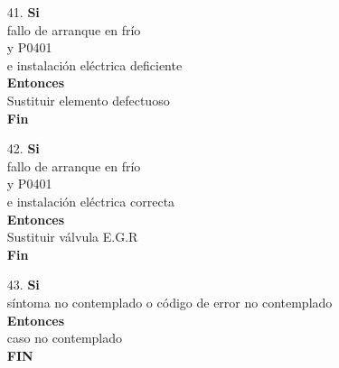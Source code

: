 \documentclass[a4paper,12pt]{article}
\newcommand\tab[1][1cm]{\hspace*{#1}}
\begin{document}
\begin{itemize}
\item[41.]\textbf{Si}\\ \tab fallo de arranque en frío\\ \tab y P0401\\ \tab e instalación eléctrica deficiente\\ \textbf{Entonces}\\ \tab Sustituir elemento defectuoso\\ \tab \textbf{Fin}
\item[42.]\textbf{Si}\\ \tab fallo de arranque en frío\\ \tab y P0401\\ \tab e instalación eléctrica correcta\\ \textbf{Entonces}\\ \tab Sustituir válvula E.G.R\\ \tab \textbf{Fin}
\item[43.]\textbf{Si}\\ \tab síntoma no contemplado o código de error no contemplado\\ \textbf{Entonces}\\ \tab caso no contemplado \\ \tab \textbf{FIN}
\end{itemize}
\end{document}
